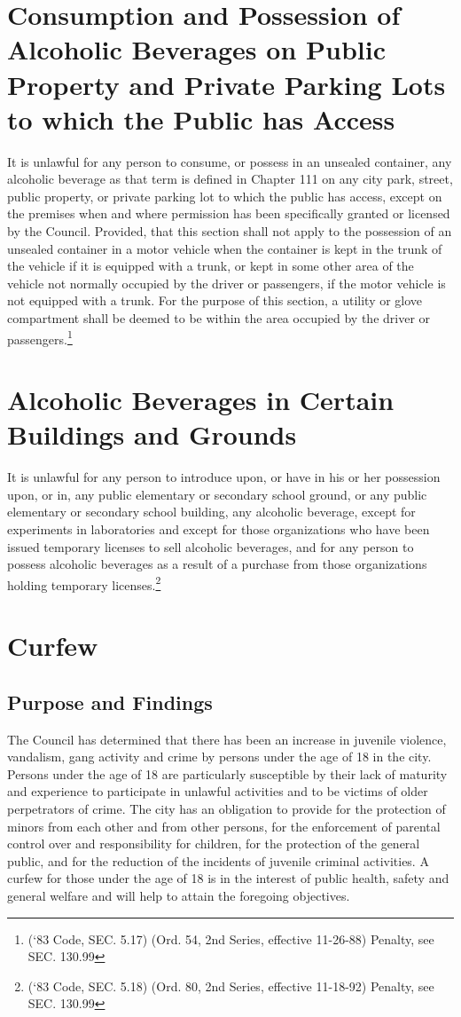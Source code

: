 \section{Consumption and Possession of Alcoholic Beverages on Public Property and Private Parking Lots to which the Public has Access}
It is unlawful for any person to consume, or possess in an unsealed container, any alcoholic beverage as that term is defined in Chapter 111 on any city park, street, public property, or private parking lot to which the public has access, except on the premises when and where permission has been specifically granted or licensed by the Council.  Provided, that this section shall not apply to the possession of an unsealed container in a motor vehicle when the container is kept in the trunk of the vehicle if it is equipped with a trunk, or kept in some other area of the vehicle not normally occupied by the driver or passengers, if the motor vehicle is not equipped with a trunk.  For the purpose of this section, a utility or glove compartment shall be deemed to be within the area occupied by the driver or passengers.\footnote{(‘83 Code, SEC. 5.17)  (Ord. 54, 2nd Series, effective 11-26-88)  Penalty, see SEC. 130.99}
\section{Alcoholic Beverages in Certain Buildings and Grounds}
It is unlawful for any person to introduce upon, or have in his or her possession upon, or in, any public elementary or secondary school ground, or any public elementary or secondary school building, any alcoholic beverage, except for experiments in laboratories and except for those organizations who have been issued temporary licenses to sell alcoholic beverages, and for any person to possess alcoholic beverages as a result of a purchase from those organizations holding temporary licenses.\footnote{(‘83 Code, SEC. 5.18)  (Ord. 80, 2nd Series, effective 11-18-92)  Penalty, see SEC. 130.99}
\section{Curfew}
\subsection{Purpose and Findings}
The Council has determined that there has been an increase in juvenile violence, vandalism, gang activity and crime by persons under the age of 18 in the city.  Persons under the age of 18 are particularly susceptible by their lack of maturity and experience to participate in unlawful activities and to be victims of older perpetrators of crime.  The city has an obligation to provide for the protection of minors from each other and from other persons, for the enforcement of parental control over and responsibility for children, for the protection of the general public, and for the reduction of the incidents of juvenile criminal activities.  A curfew for those under the age of 18 is in the interest of public health, safety and general welfare and will help to attain the foregoing objectives.
